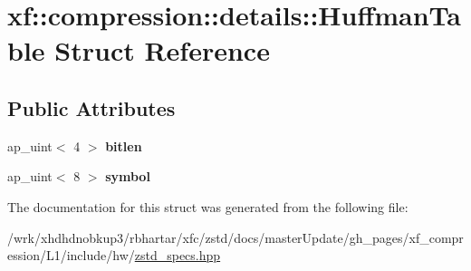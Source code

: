 \hypertarget{structxf_1_1compression_1_1details_1_1HuffmanTable}{\section{xf\-:\-:compression\-:\-:details\-:\-:Huffman\-Table Struct Reference}
\label{structxf_1_1compression_1_1details_1_1HuffmanTable}
}
\subsection*{Public Attributes}
\begin{DoxyCompactItemize}
\item 
\hypertarget{structxf_1_1compression_1_1details_1_1HuffmanTable_aacb5ca2feeb278e5ea4e143d63612beb}{ap\-\_\-uint$<$ 4 $>$ {\bfseries bitlen}}\label{structxf_1_1compression_1_1details_1_1HuffmanTable_aacb5ca2feeb278e5ea4e143d63612beb}

\item 
\hypertarget{structxf_1_1compression_1_1details_1_1HuffmanTable_adac0932855f14f60ce604f2066670fea}{ap\-\_\-uint$<$ 8 $>$ {\bfseries symbol}}\label{structxf_1_1compression_1_1details_1_1HuffmanTable_adac0932855f14f60ce604f2066670fea}

\end{DoxyCompactItemize}


The documentation for this struct was generated from the following file\-:\begin{DoxyCompactItemize}
\item 
/wrk/xhdhdnobkup3/rbhartar/xfc/zstd/docs/master\-Update/gh\-\_\-pages/xf\-\_\-compression/\-L1/include/hw/\hyperlink{zstd__specs_8hpp}{zstd\-\_\-specs.\-hpp}\end{DoxyCompactItemize}
